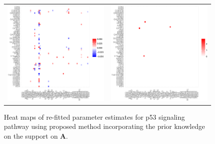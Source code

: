 \documentclass[a4paper]{article}
\begin{document}
\begin{figure}[h!]
\centering
\begin{tabular}{cc}
\includegraphics[scale=0.33]{ridgeArf.eps}&
\includegraphics[scale=0.33]{ridgePrf.eps}\\
\end{tabular}
\caption{Heat maps of re-fitted parameter estimates for p53 signaling pathway using proposed method incorporating the prior knowledge on the support on $\mathbf{A}$.}
\label{fig:ridgeArf}
\end{figure}
\end{document}
